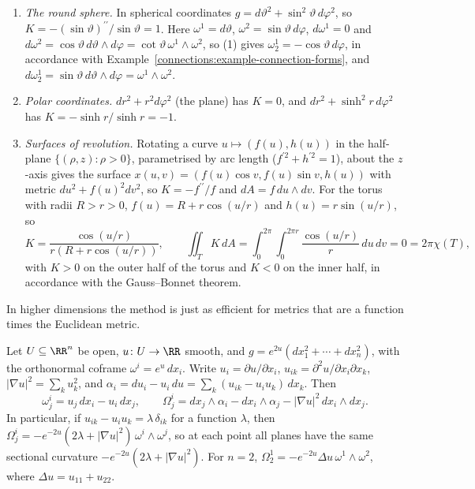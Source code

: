 \begin{example}\label{riemannian-geometry:example-frames-surfaces}
\begin{enumerate}
\item \emph{The round sphere.} In spherical coordinates $g = d\vartheta^2 + \sin^2\vartheta\,d\varphi^2$, so $K = -(\sin\vartheta)^{\prime\prime}/\sin\vartheta = 1$. Here $\omega^1 = d\vartheta$,
$\omega^2 = \sin\vartheta\,d\varphi$, $d\omega^1 = 0$ and $d\omega^2 = \cos\vartheta\,d\vartheta \wedge d\varphi = \cot\vartheta\,\omega^1 \wedge \omega^2$, so (1) gives $\omega^1_2 = -\cos\vartheta\,d\varphi$, in
accordance with Example~\ref{connections:example-connection-forms}, and $d\omega^1_2 = \sin\vartheta\,d\vartheta \wedge d\varphi = \omega^1 \wedge \omega^2$.
\item \emph{Polar coordinates.} $dr^2 + r^2d\varphi^2$ (the plane) has $K = 0$, and $dr^2 + \sinh^2r\,d\varphi^2$ has $K = -\sinh r/\sinh r = -1$.
\item \emph{Surfaces of revolution.} Rotating a curve $u \mapsto (f(u), h(u))$ in the half-plane $\{(\rho, z) : \rho > 0\}$, parametrised by arc length ($f^{\prime2} + h^{\prime2} = 1$),
about the $z$-axis gives the surface $x(u, v) = (f(u)\cos v, f(u)\sin v, h(u))$ with metric $du^2 + f(u)^2dv^2$, so $K = -f^{\prime\prime}/f$ and $dA = f\,du \wedge dv$. For the torus with radii
$R > r > 0$, $f(u) = R + r\cos(u/r)$ and $h(u) = r\sin(u/r)$, so
\[
K = \frac{\cos(u/r)}{r(R + r\cos(u/r))}, \qquad \iint_TK\,dA = \int_0^{2\pi}\!\!\int_0^{2\pi r}\frac{\cos(u/r)}{r}\,du\,dv = 0 = 2\pi\chi(T),
\]
with $K > 0$ on the outer half of the torus and $K < 0$ on the inner half, in accordance with the Gauss--Bonnet theorem.
\end{enumerate}
\end{example}

In higher dimensions the method is just as efficient for metrics that are a function times the Euclidean metric.

\begin{proposition}\label{riemannian-geometry:proposition-conformally-flat}
Let $U \subseteq \RR^n$ be open, $u \colon U \to \RR$ smooth, and $g = e^{2u}(dx_1^2 + \cdots + dx_n^2)$, with the orthonormal coframe $\omega^i = e^u\,dx_i$. Write $u_i = \partial u/\partial x_i$,
$u_{ik} = \partial^2u/\partial x_i\partial x_k$, $|\nabla u|^2 = \sum_ku_k^2$, and $\alpha_i = du_i - u_i\,du = \sum_k(u_{ik} - u_iu_k)\,dx_k$. Then
\[
\omega^i_j = u_j\,dx_i - u_i\,dx_j, \qquad \Omega^i_j = dx_j \wedge \alpha_i - dx_i \wedge \alpha_j - |\nabla u|^2\,dx_i \wedge dx_j .
\]
In particular, if $u_{ik} - u_iu_k = \lambda\,\delta_{ik}$ for a function $\lambda$, then $\Omega^i_j = -e^{-2u}(2\lambda + |\nabla u|^2)\,\omega^i \wedge \omega^j$, so at each point all planes have the same sectional
curvature $-e^{-2u}(2\lambda + |\nabla u|^2)$. For $n = 2$, $\Omega^1_2 = -e^{-2u}\Delta u\,\omega^1 \wedge \omega^2$, where $\Delta u = u_{11} + u_{22}$.
\end{proposition}

